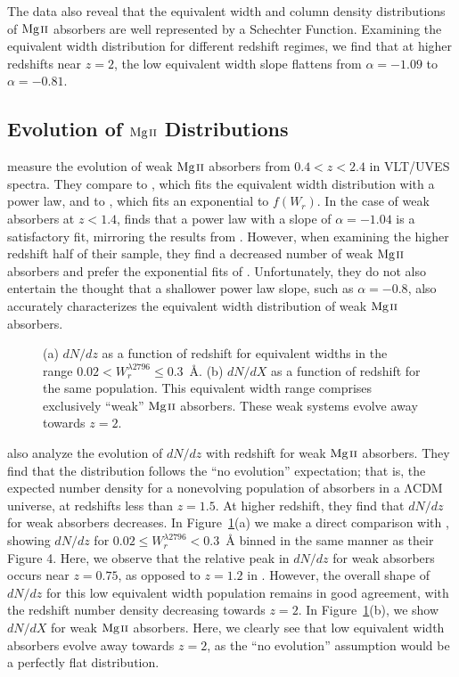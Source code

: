 \documentclass[iop,apj,numberedappendix,appendixfloats,twocolappendix]{emulateapj}
\begin{document}
The data also reveal that the equivalent width and column density distributions of ${\hbox{{\rm Mg}\kern 0.1em{\sc ii}}}$ absorbers are well represented by a Schechter Function. Examining the equivalent width distribution for different redshift regimes, we find that at higher redshifts near $z = 2$, the low equivalent width slope flattens from $\alpha = -1.09$ to $\alpha = -0.81$.

\subsection{Evolution of ${\hbox{{\rm Mg}\kern 0.1em{\sc ii}}}$ Distributions}

\cite{Narayanan2007} measure the evolution of weak ${\hbox{{\rm Mg}\kern 0.1em{\sc ii}}}$ absorbers from $0.4 < z < 2.4$ in VLT/UVES spectra. They compare to \cite{Churchill1999}, which fits the equivalent width distribution with a power law, and to \cite{Nestor2005}, which fits an exponential to $f(W_r)$. In the case of weak absorbers at $z < 1.4$, \cite{Narayanan2007} finds that a power law with a slope of $\alpha = -1.04$ is a satisfactory fit, mirroring the results from \cite{Churchill1999}. However, when examining the higher redshift half of their sample, they find a decreased number of weak ${\hbox{{\rm Mg}\kern 0.1em{\sc ii}}}$ absorbers and prefer the exponential fits of \cite{Nestor2005}. Unfortunately, they do not also entertain the thought that a shallower power law slope, such as $\alpha = -0.8$, also accurately characterizes the equivalent width distribution of weak ${\hbox{{\rm Mg}\kern 0.1em{\sc ii}}}$ absorbers. 

\begin{figure}[bth]
\caption{(a) $dN\!/dz$ as a function of redshift for equivalent widths in the range $0.02 < W_{r}^{\lambda2796} \le 0.3$~{\AA}. (b) $dN\!/dX$ as a function of redshift for the same population. This equivalent width range comprises exclusively ``weak'' ${\hbox{{\rm Mg}\kern 0.1em{\sc ii}}}$ absorbers. These weak systems evolve away towards $z = 2$.}
\label{fig:dndzbetween}
\end{figure}

\cite{Narayanan2007} also analyze the evolution of $dN\!/dz$ with redshift for weak ${\hbox{{\rm Mg}\kern 0.1em{\sc ii}}}$ absorbers. They find that the distribution follows the ``no evolution'' expectation; that is, the expected number density for a nonevolving population of absorbers in a $\mathrm{\Lambda CDM}$ universe, at redshifts less than $z = 1.5$. At higher redshift, they find that $dN\!/dz$ for weak absorbers decreases. In Figure~\ref{fig:dndzbetween}(a) we make a direct comparison with \cite{Narayanan2007}, showing $dN\!/dz$ for $0.02 \le W_r^{\lambda2796} < 0.3$~{\AA} binned in the same manner as their Figure 4. Here, we observe that the relative peak in $dN\!/dz$ for weak absorbers occurs near $z = 0.75$, as opposed to $z = 1.2$ in \cite{Narayanan2007}. However, the overall shape of $dN\!/dz$ for this low equivalent width population remains in good agreement, with the redshift number density decreasing towards $z = 2$. In Figure~\ref{fig:dndzbetween}(b), we show $dN\!/dX$ for weak ${\hbox{{\rm Mg}\kern 0.1em{\sc ii}}}$ absorbers. Here, we clearly see that low equivalent width absorbers evolve away towards $z = 2$, as the ``no evolution'' assumption would be a perfectly flat distribution. 
\end{document}
